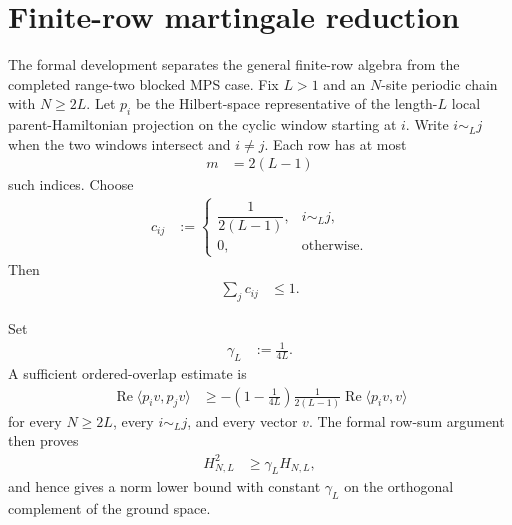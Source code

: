\documentclass{article}
\begin{document}
\section{Finite-row martingale reduction}

The formal development separates the general finite-row algebra from the
completed range-two blocked MPS case. Fix $L>1$ and an $N$-site periodic chain
with $N\geq2L$. Let $p_i$ be the Hilbert-space representative of the
length-$L$ local parent-Hamiltonian projection on the cyclic window starting at
$i$. Write $i\sim_Lj$ when the two windows intersect and $i\neq j$. Each row
has at most
\begin{align}
    m & =2(L-1)
    \label{eq:cpgsv21_martingale_overlap_overlap_row_cardinality}
\end{align}
such indices. Choose
\begin{align}
    c_{ij}
     & :=
    \begin{cases}
        \dfrac{1}{2(L-1)}, & i\sim_Lj,         \\
        0,                 & \text{otherwise}.
    \end{cases}
    \label{eq:cpgsv21_martingale_overlap_uniform_row_coefficient}
\end{align}
Then
\begin{align}
    \sum_jc_{ij}
     & \leq1.
    \label{eq:cpgsv21_martingale_overlap_row_sum_bound}
\end{align}

Set
\begin{align}
    \gamma_L
     & :=\frac{1}{4L}.
    \label{eq:cpgsv21_martingale_overlap_special_gap_constant}
\end{align}
A sufficient ordered-overlap estimate is
\begin{align}
    \operatorname{Re}\langle p_iv,p_jv\rangle
     & \geq
    -\left(1-\frac{1}{4L}\right)
    \frac{1}{2(L-1)}
    \operatorname{Re}\langle p_iv,v\rangle
    \label{eq:cpgsv21_martingale_overlap_ordered_cross_term}
\end{align}
for every $N\geq2L$, every $i\sim_Lj$, and every vector $v$. The formal
row-sum argument then proves
\begin{align}
    H_{N,L}^2
     & \geq\gamma_LH_{N,L},
    \label{eq:cpgsv21_martingale_overlap_finite_row_gap}
\end{align}
and hence gives a norm lower bound with constant $\gamma_L$ on the orthogonal
complement of the ground space.
\end{document}
